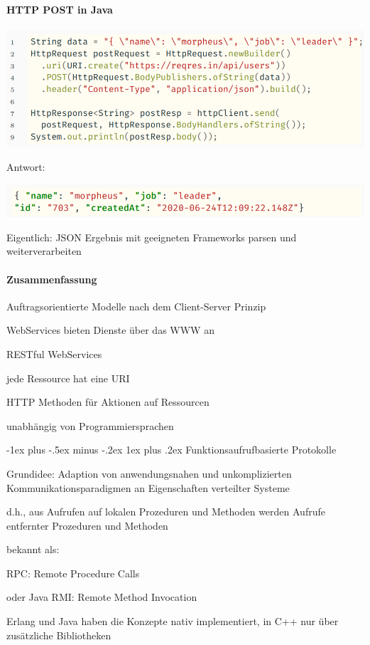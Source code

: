 \documentclass[10pt]{article}
\makeatletter
\renewcommand{\subsubsection}{\@startsection{subsubsection}{3}{0mm}%
                                {-1ex plus -.5ex minus -.2ex}%
                                {1ex plus .2ex}%
                                {\normalfont\small\bfseries}}
\makeatother
\begin{document}
\paragraph{HTTP POST in Java}

\begin{center}
  \includegraphics[width=0.4\linewidth]{Assets/Programmierparadigmen-code-snippet-74}
\end{center}
Antwort: 
\begin{center}
  \includegraphics[width=0.4\linewidth]{Assets/Programmierparadigmen-code-snippet-75}
\end{center}
Eigentlich: JSON Ergebnis mit geeigneten Frameworks parsen und weiterverarbeiten

\paragraph{Zusammenfassung}

\begin{itemize*}
  \item Auftragsorientierte Modelle nach dem Client-Server Prinzip
  \item WebServices bieten Dienste über das WWW an
  \item RESTful WebServices
  \begin{itemize*}
    \item jede Ressource hat eine URI
    \item HTTP Methoden für Aktionen auf Ressourcen
    \item unabhängig von Programmiersprachen
  \end{itemize*}
\end{itemize*}

\subsubsection{Funktionsaufrufbasierte Protokolle}
\begin{itemize*}
  \item Grundidee: Adaption von anwendungsnahen und unkomplizierten Kommunikationsparadigmen an Eigenschaften verteilter Systeme
  \item d.h., aus Aufrufen auf lokalen Prozeduren und Methoden werden Aufrufe entfernter Prozeduren und Methoden
  \item bekannt als:
  \begin{itemize*}
    \item RPC: Remote Procedure Calls
    \item oder Java RMI: Remote Method Invocation
  \end{itemize*}
  \item Erlang und Java haben die Konzepte nativ implementiert, in C++ nur über zusätzliche Bibliotheken
\end{itemize*}
\end{document}
